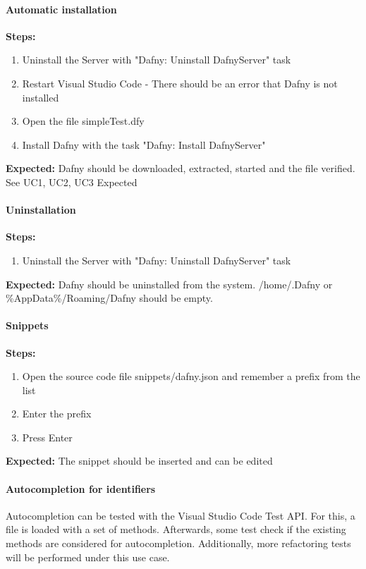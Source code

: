 \paragraph{Automatic installation}
\textbf{\newline Steps:}
\begin{enumerate}
	\item Uninstall the Server with "Dafny: Uninstall DafnyServer" task
	\item Restart Visual Studio Code - There should be an error that Dafny is not installed
	\item Open the file simpleTest.dfy
	\item Install Dafny with the task "Dafny: Install DafnyServer" 
\end{enumerate}
\textbf{\newline Expected:}
Dafny should be downloaded, extracted, started and the file verified. See UC1, UC2, UC3 Expected


\paragraph{Uninstallation}
\textbf{\newline Steps:}
\begin{enumerate}
	\item Uninstall the Server with "Dafny: Uninstall DafnyServer" task
\end{enumerate}
\textbf{\newline Expected:}
Dafny should be uninstalled from the system. /home/.Dafny or \%AppData\%/Roaming/Dafny should be empty.


\paragraph{Snippets}
\textbf{\newline Steps:}
\begin{enumerate}
	\item Open the source code file snippets/dafny.json and remember a prefix from the list
	\item Enter the prefix 
	\item Press Enter
\end{enumerate}
\textbf{\newline Expected:}
The snippet should be inserted and can be edited


\paragraph{Autocompletion for identifiers}
Autocompletion can be tested with the Visual Studio Code Test API. For this, a file is loaded with a set of methods. Afterwards, some test check if the existing methods are considered for autocompletion. Additionally, more refactoring tests will be performed under this use case. 
